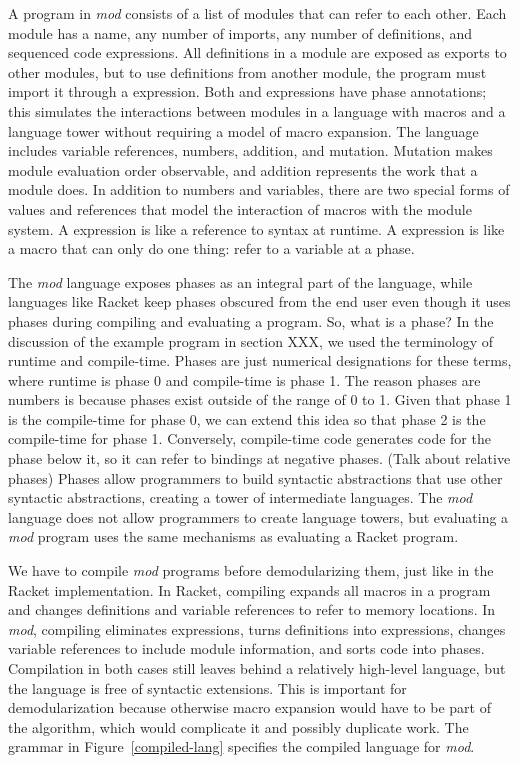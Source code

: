 \documentclass[ms,electronic,letterpaper,lol,lof,lot]{byumsphd}
\begin{document}
A program in \emph{mod} consists of a list of modules that can refer to each other.
Each module has a name, any number of imports, any number of definitions, and sequenced code expressions. 
All definitions in a module are exposed as exports to other modules, but to use definitions from another module, the program must import it through a  expression.
Both  and  expressions have phase annotations; this simulates the interactions between modules in a language with macros and a language tower without requiring a model of macro expansion.
The language includes variable references, numbers, addition, and mutation.
Mutation makes module evaluation order observable, and addition represents the work that a module does.
In addition to numbers and variables, there are two special forms of values and references that model the interaction of macros with the module system.
A  expression is like a reference to syntax at runtime.
A  expression is like a macro that can only do one thing: refer to a variable at a phase.

The \emph{mod} language exposes phases as an integral part of the language, while languages like Racket keep phases obscured from the end user even though it uses phases during compiling and evaluating a program.
So, what is a phase?
In the discussion of the example program in section XXX, we used the terminology of runtime and compile-time.
Phases are just numerical designations for these terms, where runtime is phase 0 and compile-time is phase 1.
The reason phases are numbers is because phases exist outside of the range of 0 to 1.
Given that phase 1 is the compile-time for phase 0, we can extend this idea so that phase 2 is the compile-time for phase 1.
Conversely, compile-time code generates code for the phase below it, so it can refer to bindings at negative phases.
(Talk about relative phases)
Phases allow programmers to build syntactic abstractions that use other syntactic abstractions, creating a tower of intermediate languages.
The \emph{mod} language does not allow programmers to create language towers, but evaluating a \emph{mod} program uses the same mechanisms as evaluating a Racket program.

We have to compile \emph{mod} programs before demodularizing them, just like in the Racket implementation.
In Racket, compiling expands all macros in a program and changes definitions and variable references to refer to memory locations.
In \emph{mod}, compiling eliminates  expressions, turns definitions into  expressions, changes variable references to include module information, and sorts code into phases.
Compilation in both cases still leaves behind a relatively high-level language, but the language is free of syntactic extensions.
This is important for demodularization because otherwise macro expansion would have to be part of the algorithm, which would complicate it and possibly duplicate work.
The grammar in Figure~\ref{compiled-lang} specifies the compiled language for \emph{mod}.
\end{document}
